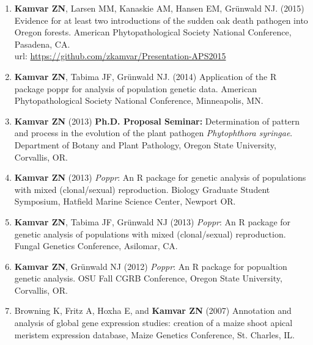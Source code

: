 \begin{enumerate}[leftmargin = 14pt]
	\item \textbf{Kamvar ZN}, Larsen MM, Kanaskie AM, Hansen EM, Gr\"unwald NJ.
	(2015) Evidence for at least two introductions of the sudden oak death
	pathogen into Oregon forests. American Phytopathological Society National
	Conference, Pasadena, CA. \\
	url: \href{https://github.com/zkamvar/Presentation-APS2015#readme}{https://github.com/zkamvar/Presentation-APS2015}

	\vspace{3pt}

	\item \textbf{Kamvar ZN}, Tabima JF, Gr\"unwald NJ. (2014) Application of
	the R package poppr for analysis of population genetic data. American
	Phytopathological Society National Conference, Minneapolis, MN.

	\vspace{3pt}

	\item \textbf{Kamvar ZN} (2013) \textbf{Ph.D. Proposal Seminar:} Determination of
	pattern and process in the evolution of the plant pathogen
	\textit{Phytophthora syringae}. Department of Botany and Plant Pathology,
	Oregon State University, Corvallis, OR.

	\vspace{3pt}

	\item \textbf{Kamvar ZN} (2013) \textit{Poppr}: An R package for genetic
	analysis of populations with mixed (clonal/sexual) reproduction. Biology
	Graduate Student Symposium, Hatfield Marine Science Center, Newport OR.

	\vspace{3pt}

	\item \textbf{Kamvar ZN}, Tabima JF, Gr\"unwald NJ (2013) \textit{Poppr}: An
	R package for genetic analysis of populations with mixed (clonal/sexual)
	reproduction. Fungal Genetics Conference, Asilomar, CA.

	\vspace{3pt}

	\item \textbf{Kamvar ZN}, Gr\"unwald NJ (2012) \textit{Poppr}: An R package
	for popualtion genetic analysis. OSU Fall CGRB Conference, Oregon State
	University, Corvallis, OR.

	\vspace{3pt}

	\item Browning K, Fritz A, Hoxha E, and \textbf{Kamvar ZN} (2007) Annotation
	and analysis of global gene expression studies: creation of a maize shoot
	apical meristem expression database, Maize Genetics Conference, St. Charles,
	IL.


\end{enumerate}
